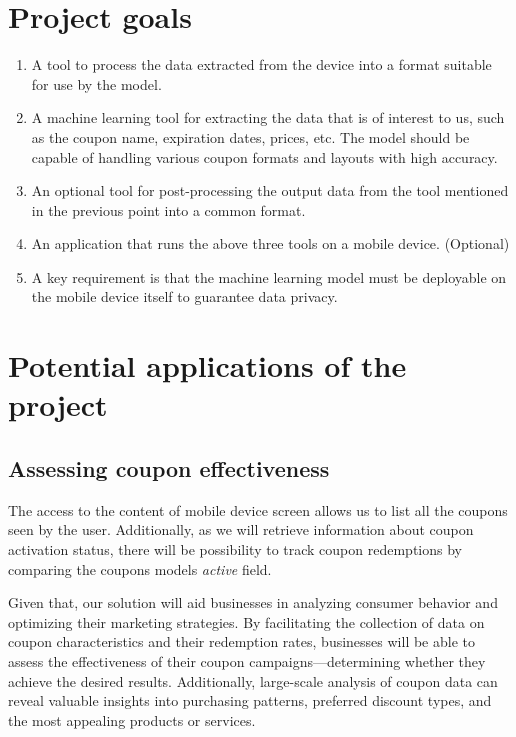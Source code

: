 \documentclass[licencjacka,en]{pracamgr}
\begin{document}
\section{Project goals}
\begin{enumerate}
    \item A tool to process the data extracted from the device into a format suitable for use by the model.
    \item A machine learning tool for extracting the data that is of interest to us, such as the coupon name, expiration dates, prices, etc. The model should be capable of handling various coupon formats and layouts with high accuracy.
    \item An optional tool for post-processing the output data from the tool mentioned in the previous point into a common format.
    \item An application that runs the above three tools on a mobile device. (Optional)
    \item A key requirement is that the machine learning model must be deployable on the mobile device itself to guarantee data privacy.
\end{enumerate} 

\section{Potential applications of the project}
\subsection{Assessing coupon effectiveness}
The access to the content of mobile device screen allows us to list all the coupons seen by the user. Additionally, as we will retrieve information about coupon activation status, there will be possibility to track coupon redemptions by comparing the coupons models \textit{active} field.

Given that, our solution will aid businesses in analyzing consumer behavior and optimizing their marketing strategies. By facilitating the collection of data on coupon characteristics and their redemption rates, businesses will be able to assess the effectiveness of their coupon campaigns—determining whether they achieve the desired results. Additionally, large-scale analysis of coupon data can reveal valuable insights into purchasing patterns, preferred discount types, and the most appealing products or services.
\end{document}
